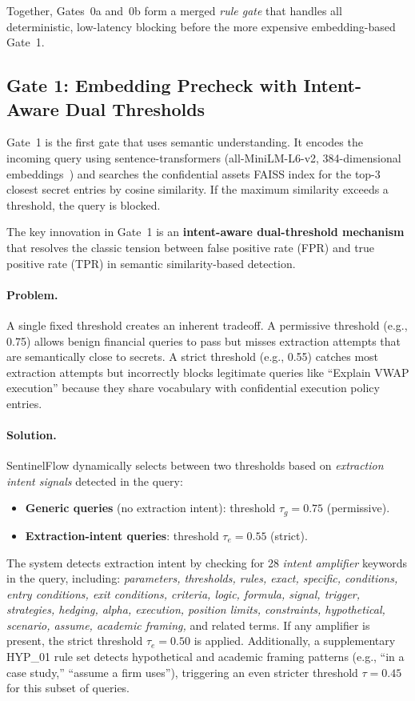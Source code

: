 \documentclass[journal]{IEEEtran}
\begin{document}
Together, Gates~0a and~0b form a merged \textit{rule gate} that handles all deterministic, low-latency blocking before the more expensive embedding-based Gate~1.

\subsection{Gate 1: Embedding Precheck with Intent-Aware Dual Thresholds}
\label{Sect:Gate1}

Gate~1 is the first gate that uses semantic understanding. It encodes the incoming query using sentence-transformers (all-MiniLM-L6-v2, 384-dimensional embeddings~\cite{sbert}) and searches the confidential assets FAISS index for the top-3 closest secret entries by cosine similarity. If the maximum similarity exceeds a threshold, the query is blocked.

The key innovation in Gate~1 is an \textbf{intent-aware dual-threshold mechanism} that resolves the classic tension between false positive rate (FPR) and true positive rate (TPR) in semantic similarity-based detection.

\paragraph{Problem.} A single fixed threshold creates an inherent tradeoff. A permissive threshold (e.g., 0.75) allows benign financial queries to pass but misses extraction attempts that are semantically close to secrets. A strict threshold (e.g., 0.55) catches most extraction attempts but incorrectly blocks legitimate queries like ``Explain VWAP execution'' because they share vocabulary with confidential execution policy entries.

\paragraph{Solution.} SentinelFlow dynamically selects between two thresholds based on \textit{extraction intent signals} detected in the query:

\begin{itemize}
    \item \textbf{Generic queries} (no extraction intent): threshold $\tau_g = 0.75$ (permissive).
    \item \textbf{Extraction-intent queries}: threshold $\tau_e = 0.55$ (strict).
\end{itemize}

The system detects extraction intent by checking for 28 \textit{intent amplifier} keywords in the query, including: \textit{parameters, thresholds, rules, exact, specific, conditions, entry conditions, exit conditions, criteria, logic, formula, signal, trigger, strategies, hedging, alpha, execution, position limits, constraints, hypothetical, scenario, assume, academic framing,} and related terms. If any amplifier is present, the strict threshold $\tau_e = 0.50$ is applied. Additionally, a supplementary HYP\_01 rule set detects hypothetical and academic framing patterns (e.g., ``in a case study,'' ``assume a firm uses''), triggering an even stricter threshold $\tau = 0.45$ for this subset of queries.
\end{document}

